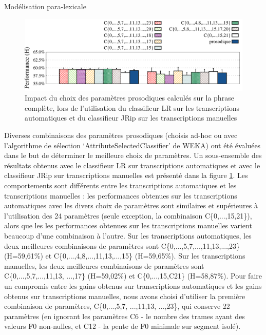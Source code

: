 \documentclass{style/these}
\begin{document}
\begin{part}{Modélisation para-lexicale}
\begin{figure}[h!]
\centering
\includegraphics[scale=0.59]{images/results/completeSentence_compareProsodicFeatures.pdf}
\caption{Impact du choix des paramètres prosodiques calculés sur la phrase complète, lors de l'utilisation du classifieur LR sur les transcriptions automatiques et du classifieur JRip sur les transcriptions manuelles}
\label{Fig:QD-p-PFeatures-JRip-LR}
\end{figure}

Diverses combinaisons des paramètres prosodiques (choisis ad-hoc ou avec l'algorithme de sélection `AttributeSelectedClassifier' de WEKA) ont été évaluées dans le but de déterminer le meilleure choix de paramètres. Un sous-ensemble des résultats obtenus avec le classifieur LR sur transcriptions automatiques et avec le classifieur JRip sur transcriptions manuelles est présenté dans la figure \ref{Fig:QD-p-PFeatures-JRip-LR}. 
Les comportements sont différents entre les transcriptions automatiques et les transcriptions manuelles : les performances obtenues sur les transcriptions automatiques avec les divers choix de paramètres sont similaires et supérieures à l'utilisation des 24 paramètres (seule exception, la combinaison C\{0,...,15,21\}), alors que les les performances obtenues sur les transcriptions manuelles varient beaucoup d'une combinaison à l'autre.  
Sur les transcriptions automatiques, les deux meilleures combinaisons de paramètres sont C\{0,...,5,7,...,11,13,...,23\} (H=59,61\%) et C\{0,...,4,8,...,11,13,...,15\} (H=59,65\%). 
Sur les transcriptions manuelles, les deux meilleures combinaisons de paramètres sont C\{0,...,5,7,...,11,13, ...,17\} \linebreak (H=59,02\%) et C\{0,...,15,C21\} (H=58,87\%). 
Pour faire un compromis entre les gains obtenus sur transcriptions automatiques et les gains obtenus sur transcriptions manuelles, nous avons choisi d'utiliser la première combinaison de paramètres, C\{0,...,5,7, ...,11,13, ...,23\}, qui conserve 22 paramètres (en ignorant les paramètres C6 - le nombre des trames ayant des valeurs F0 non-nulles, et C12 - la pente de F0 minimale sur segment isolé). 


\end{part}
\end{document}
